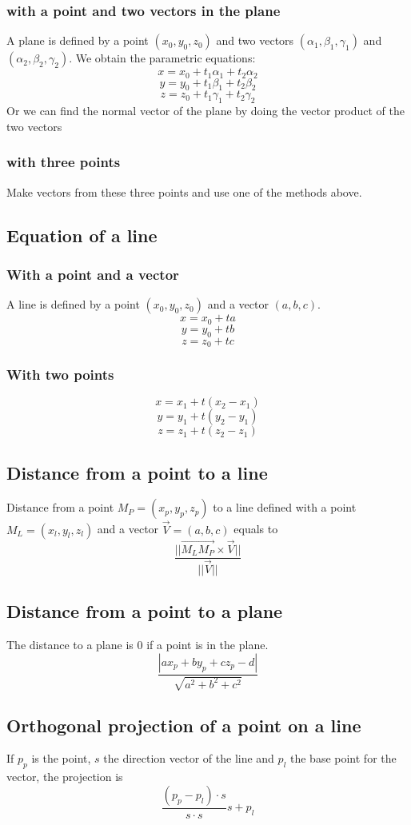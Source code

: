 \subsubsection{with a point and two vectors in the plane}
A plane is defined by a point $(x_0, y_0, z_0)$ and two vectors $(\alpha_1, \beta_1, \gamma_1)$ and $(\alpha_2, \beta_2, \gamma_2)$. We obtain the parametric equations:
$$x=x_0+t_1\alpha_1+t_2\alpha_2$$
$$y=y_0+t_1\beta_1+t_2\beta_2$$
$$z=z_0+t_1\gamma_1+t_2\gamma_2$$
Or we can find the normal vector of the plane by doing the vector product of the two vectors
\subsubsection{with three points}
Make vectors from these three points and use one of the methods above.
\subsection{Equation of a line}
\subsubsection{With a point and a vector}
A line is defined by a point $(x_0, y_0, z_0)$ and a vector $(a, b, c)$.
$$x=x_0+ta$$
$$y=y_0+tb$$
$$z=z_0+tc$$
\subsubsection{With two points}
$$x=x_1+t(x_2-x_1)$$
$$y=y_1+t(y_2-y_1)$$
$$z=z_1+t(z_2-z_1)$$
\subsection{Distance from a point to a line}
Distance from a point $M_P=(x_p, y_p, z_p)$ to a line defined with a point $M_L=(x_l, y_l, z_l)$ and a vector $\vec{V}=(a, b, c)$ equals to
$$\frac{||\vec{M_LM_P}\times\vec{V}||}{||\vec{V}||}$$
\subsection{Distance from a point to a plane}
The distance to a plane is 0 if a point is in the plane.
$$\frac{|ax_p+by_p+cz_p-d|}{\sqrt{a^2+b^2+c^2}}$$
\subsection{Orthogonal projection of a point on a line}
If $p_p$ is the point, $s$ the direction vector of the line and $p_l$ the base point for the vector, the projection is
$$\frac{(p_p-p_l)\cdot s}{s\cdot s}s+p_l$$
